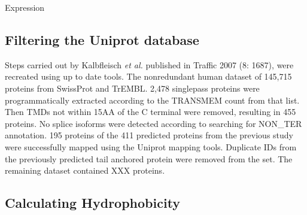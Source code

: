 Expression
\subsection{Filtering the Uniprot database}
Steps carried out by Kalbfleisch {\it et al.} published in Traffic 2007 (8: 1687)\cite{Kalbfleisch2007}, were recreated using up to date tools. The non\-redundant human dataset of 145,715 proteins from SwissProt and TrEMBL\cite{TheUniProtConsortium2014}. 2,478 singlepass proteins were programmatically extracted according to the TRANSMEM count from that list. Then TMDs not within 15AA of the C terminal were removed, resulting in 455 proteins. No splice isoforms were detected according to searching for NON\_TER annotation. 195 proteins of the 411 predicted proteins from the previous study were successfully mapped using the Uniprot mapping tools\cite{TheUniProtConsortium2014}. Duplicate IDs from the previously predicted tail anchored protein were removed from the set. The remaining dataset contained XXX proteins.

\subsection{Calculating Hydrophobicity}

